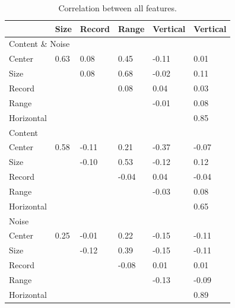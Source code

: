 \begin{table}[h]
\centering
\caption{Correlation between all features.}
\label{tab:featcorr}
\begin{tabular}{ | l | l | l | l | l | l |}
\hline
& Size & Record & Range & Vertical & Vertical \\ \hline
\multicolumn{6}{|l|}{Content \& Noise} \\
\hline
Center & 0.63 & 0.08 & 0.45 & -0.11 & 0.01 \\
Size & & 0.08 & 0.68 & -0.02 & 0.11 \\
Record & & & 0.08 & 0.04 & 0.03 \\
Range & & & & -0.01 & 0.08 \\
Horizontal & & & & & 0.85 \\
\hline
\multicolumn{6}{|l|}{Content} \\
\hline
Center & 0.58 & -0.11 & 0.21 & -0.37 & -0.07 \\
Size & & -0.10 & 0.53 & -0.12 & 0.12 \\
Record & & & -0.04 & 0.04 & -0.04 \\
Range & & & & -0.03 & 0.08 \\
Horizontal & & & & & 0.65 \\
\hline
\multicolumn{6}{|l|}{Noise} \\
\hline
Center & 0.25 & -0.01 & 0.22 & -0.15 & -0.11 \\
Size & & -0.12 & 0.39 & -0.15 & -0.11 \\
Record & & & -0.08 & 0.01 & 0.01 \\
Range & & & & -0.13 & -0.09 \\
Horizontal & & & & & 0.89 \\
\hline
\end{tabular}
\end{table}

